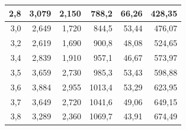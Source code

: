 \begin{enumerate}
\begin{table}[h!]
{\begin{tabular}{|r|r|r|r|r|r|}
					2,8                          & 3,079                              & 2,150                                          & 788,2                                       & 66,26                                                                                            & 428,35                        \\ \hline
					3,0                          & 2,649                              & 1,720                                          & 844,5                                       & 53,44                                                                                            & 476,07                        \\ \hline
					3,2                          & 2,619                              & 1,690                                          & 900,8                                       & 48,08                                                                                            & 524,65                        \\ \hline
					3,4                          & 2,839                              & 1,910                                          & 957,1                                       & 46,67                                                                                            & 573,97                        \\ \hline
					3,5                          & 3,659                              & 2,730                                          & 985,3                                       & 53,43                                                                                            & 598,88                        \\ \hline
					3,6                          & 3,884                              & 2,955                                          & 1013,4                                      & 53,29                                                                                            & 623,95                        \\ \hline
					3,7                          & 3,649                              & 2,720                                          & 1041,6                                      & 49,06                                                                                            & 649,15                        \\ \hline
					3,8                          & 3,289                              & 2,360                                          & 1069,7                                      & 43,91                                                                                            & 674,49                        \\ \hline

\end{tabular}}
\end{table}
\end{enumerate}
